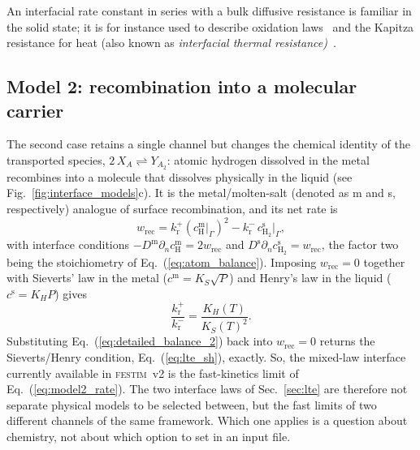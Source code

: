 \documentclass[5p]{elsarticle}
\newcommand{\FESTIM}{\textsc{festim}}
\newcommand{\cm}[1]{c^{\mathrm{m}}_{#1}}   %
\newcommand{\cs}[1]{c^{\mathrm{s}}_{#1}}   %
\begin{document}
An interfacial rate constant in series with a bulk diffusive resistance is familiar in the solid state; it is for instance used to describe oxidation laws~\cite{deal_general_1965} and the Kapitza resistance for heat (also known as \textit{interfacial thermal resistance)}~\cite{swartz_thermal_1989}.

\subsection{Model 2: recombination into a molecular carrier}
\label{sec:model2}

The second case retains a single channel but changes the chemical identity of the transported species, $2\,X_A \rightleftharpoons Y_{A_2}$: atomic hydrogen dissolved in the metal recombines into a molecule that dissolves physically in the liquid (see Fig.~\ref{fig:interface_models}c).
It is the metal/molten-salt (denoted as m and s, respectively) analogue of surface recombination, and its net rate is
\begin{equation}
    w_{\mathrm{rec}} = k_{\mathrm{r}}^{+}\left(\cm{\mathrm{H}}\big|_\Gamma\right)^{2}
                     - k_{\mathrm{r}}^{-}\,\cs{\mathrm{H_2}}\big|_\Gamma ,
    \label{eq:model2_rate}
\end{equation}
with interface conditions $-D^{\mathrm{m}}\partial_n \cm{\mathrm{H}} = 2 w_{\mathrm{rec}}$ and $D^{\mathrm{s}}\partial_n \cs{\mathrm{H_2}} = w_{\mathrm{rec}}$, the factor two being the stoichiometry of Eq.~(\ref{eq:atom_balance}). 
Imposing $w_{\mathrm{rec}} = 0$ together with Sieverts' law in the metal ($c^{\mathrm{m}} = K_S\sqrt{P}$) and Henry's law in the liquid ($c^{\mathrm{s}} = K_H P$) gives
\begin{equation}
    \frac{k_{\mathrm{r}}^{+}}{k_{\mathrm{r}}^{-}}
    = \frac{K_{H}(T)}{K_{S}(T)^{2}} .
    \label{eq:detailed_balance_2}
\end{equation}
Substituting Eq.~(\ref{eq:detailed_balance_2}) back into $w_{\mathrm{rec}} = 0$ returns the Sieverts/Henry condition, Eq.~(\ref{eq:lte_sh}), exactly.
So, the mixed-law interface currently available in \FESTIM{}~v2 is the fast-kinetics limit of Eq.~(\ref{eq:model2_rate}).
The two interface laws of Sec.~\ref{sec:lte} are therefore not separate physical models to be selected between, but the fast limits of two different channels of the same framework.
Which one applies is a question about chemistry, not about which option to set in an input file.
\end{document}
